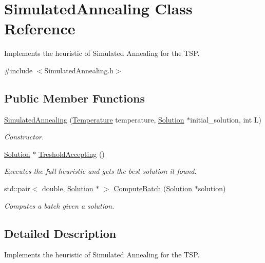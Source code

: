 \hypertarget{classSimulatedAnnealing}{}\section{Simulated\+Annealing Class Reference}
\label{classSimulatedAnnealing}


Implements the heuristic of Simulated Annealing for the T\+SP.  




{\ttfamily \#include $<$Simulated\+Annealing.\+h$>$}

\subsection*{Public Member Functions}
\begin{DoxyCompactItemize}
\item 
\hyperlink{classSimulatedAnnealing_a63685beb57940ca2eb39e2d6381ca475}{Simulated\+Annealing} (\hyperlink{classTemperature}{Temperature} temperature, \hyperlink{classSolution}{Solution} $\ast$initial\+\_\+solution, int L)
\begin{DoxyCompactList}\small\item\em Constructor. \end{DoxyCompactList}\item 
\hyperlink{classSolution}{Solution} $\ast$ \hyperlink{classSimulatedAnnealing_a863ea18e7ff3f9ba90293a295e44b821}{Treshold\+Accepting} ()
\begin{DoxyCompactList}\small\item\em Executes the full heuristic and gets the best solution it found. \end{DoxyCompactList}\item 
std\+::pair$<$ double, \hyperlink{classSolution}{Solution} $\ast$ $>$ \hyperlink{classSimulatedAnnealing_a9f8d7e17561ff6730aadb34b0340b086}{Compute\+Batch} (\hyperlink{classSolution}{Solution} $\ast$solution)
\begin{DoxyCompactList}\small\item\em Computes a batch given a solution. \end{DoxyCompactList}\end{DoxyCompactItemize}


\subsection{Detailed Description}
Implements the heuristic of Simulated Annealing for the T\+SP. 

